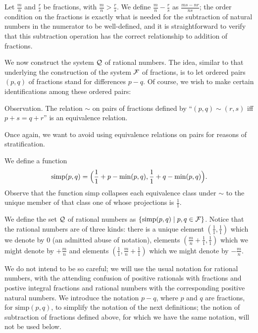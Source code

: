 \begin{definition}
 Let $\displaystyle\frac mn$ and $\displaystyle\frac rs$ be fractions, with 
 $\displaystyle\frac mn > \frac rs$.  We define $\displaystyle\frac mn - \frac
 rs$ as $\displaystyle\frac{ms -
 nr}{ns}$; the order condition on the fractions is exactly what is
 needed for the subtraction of natural numbers in the numerator to be
 well-defined, and it is straightforward to verify that this
 subtraction operation has the correct relationship to addition of
 fractions.
\end{definition}

We now construct the system ${\cal Q}$ of rational
numbers.  The idea,
similar to that underlying the construction of the system ${\cal F}$
of fractions, is to let ordered pairs $(p,q)$ of
fractions stand for differences $p - q$.  Of course, we wish to make
certain identifications among these ordered pairs:

\begin{ThmEtc}{Observation.}
 The relation $\sim$ on pairs of fractions defined
 by ``$(p,q)\sim(r,s)$ iff $p+s = q+r$'' is an equivalence
 relation.
\end{ThmEtc}

Once again, we want to avoid using equivalence relations on pairs for reasons of stratification.

\begin{definition}
 We define a function
 $$
  \mathrm{simp}(p,q) = \Bigl(\frac
  11+p-\min(p,q),\frac 11+q-\min(p,q)\Bigr).
 $$
 Observe that the function simp 
 collapses each equivalence class under $\sim$ to the unique member of that class
 one of whose projections is $\frac 11$.
\end{definition}

\begin{definition}
 We define the set ${\cal Q}$ of {\upshape rational numbers\/} as $\{\mathrm{simp}(p,q) \mid p,q \in {\cal F}\}$.
 Notice
 that the rational numbers are of three kinds: there is a unique element 
 $(\frac 11,\frac 11)$ which we denote by 0 (an admitted abuse of
 notation), elements $(\frac mn + \frac11,\frac11)$ which we might
 denote by $+\frac mn$ and elements $(\frac 11, \frac mn + \frac11)$
 which we might denote by $-\frac mn$.
\end{definition}
We do not intend to be so
careful; we will use the usual notation for rational numbers, with the
attending confusion of positive rationals with
fractions and postive integral fractions and rational
numbers with the corresponding positive natural
numbers.  We introduce the notation $p - q$, where $p$ and $q$ are
fractions, for $\mathrm{simp}(p,q)$, to simplify the notation of the next
definitions; the notion of subtraction of fractions defined above, for
which we have the same notation, will not be used below.

